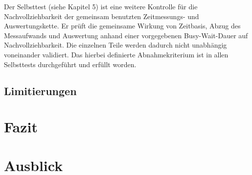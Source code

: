 Der Selbsttest (siehe Kapitel 5) ist eine weitere Kontrolle für die Nachvollziehbarkeit der gemeinsam benutzten Zeitmessungs- und Auswertungskette. Er prüft die gemeinsame Wirkung von Zeitbasis, Abzug des Messaufwands und Auswertung anhand einer vorgegebenen Busy-Wait-Dauer auf Nachvollziehbarkeit. Die einzelnen Teile werden dadurch nicht unabhängig voneinander validiert. Das hierbei definierte Abnahmekriterium ist in allen Selbsttests durchgeführt und erfüllt worden.

\section{Limitierungen}

\chapter{Fazit}
\label{ch:fazit}

\chapter{Ausblick}
\label{ch:ausblick}
